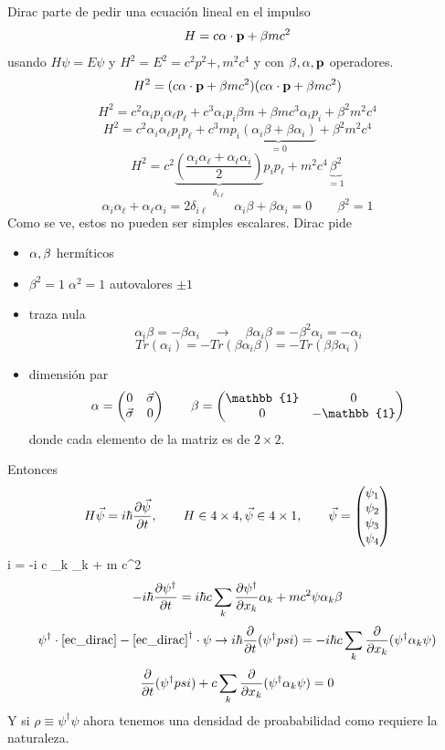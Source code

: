 \documentclass[10pt,oneside]{CBFT_book}
\begin{document}
Dirac parte de pedir una ecuación lineal en el impulso 
\[
	H = c \vb{\alpha} \cdot \vb{p} + \beta m c^2
\]
usando $H\psi = E\psi$ y $H^2 = E^2 = c^2p^2 + ,m^2 c^4$ y con $\beta,\vb{\alpha},\vb{p}$ operadores.
\[
	H^2 = (c \vb{\alpha} \cdot \vb{p} + \beta m c^2)(c \vb{\alpha} \cdot \vb{p} + \beta m c^2)
\]
\[
	H^2 = c^2 \alpha_i p_i \alpha_\ell p_\ell + c^3 \alpha_i p_i \beta m +
	\beta m c^3 \alpha_i p_i + \beta^2 m^2 c^4
\]
\[
	H^2 = c^2 \alpha_i \alpha_\ell p_i  p_\ell + c^3 m p_i \underbrace{( \alpha_i \beta + \beta \alpha_i )}_{=0}
	+ \beta^2 m^2 c^4
\]
\[
	H^2 = 
	c^2 \underbrace{\left( \frac{\alpha_i \alpha_\ell + \alpha_\ell\alpha_i}{2} \right)}_{\delta_{i\ell}}
	p_i p_\ell + m^2 c^4 \underbrace{\beta^2 }_{ = 1 }
\]
\[
	\alpha_i \alpha_\ell + \alpha_\ell\alpha_i = 2 \delta_{i\ell} \qquad 
	\alpha_i \beta + \beta \alpha_i= 0 \qquad
	\beta^2 = 1
\]
Como se ve, estos no pueden ser simples escalares. Dirac pide 
\begin{itemize}
 \item $\vb{\alpha},\beta$ hermíticos
 \item $\beta^2=1 \; \alpha^2=1$ autovalores $\pm 1$
 \item traza nula
 \[
	\alpha_i \beta = -\beta \alpha_i  \quad \rightarrow  \quad 
	\beta \alpha_i \beta = -\beta^2 \alpha_i = -\alpha_i
 \]
 \[
	Tr(\alpha_i) = -Tr(\beta \alpha_i \beta) = -Tr(\beta\beta\alpha_i)
 \]
 \item dimensión par 
 \[
	\vb{\alpha} = \begin{pmatrix} 0 & \vec{\sigma} \\ \vec{\sigma} & 0 \\ \end{pmatrix} \qquad 
	\beta = \begin{pmatrix} \mathbb{1} & 0 \\ 0 & -\mathbb{1} \\ \end{pmatrix}
 \]
 donde cada elemento de la matriz es de $2\times2$.
\end{itemize}

Entonces
\[
	H \vec{\psi} = i \hbar \frac{\partial^{\hspace{-0.05em}} {\vec{\psi}}}{\partial {t}^{\hspace{-0.05em}}}, \qquad H \in 4\times 4, \vec{\psi} \in 4\times 1, \qquad
	\vec{\psi} = \begin{pmatrix} \psi_1 \\ \psi_2 \\ \psi_3 \\ \psi_4 \end{pmatrix}
\]
\be \label{ec_dirac}
	i \hbar {} = -i \hbar c \sum_k \alpha_k  + m c^2 \beta \psi
\ee
\[
	-i \hbar \frac{\partial^{\hspace{-0.05em}} {\psi^\dagger}}{\partial {t}^{\hspace{-0.05em}}} = i \hbar c \sum_k \frac{\partial^{\hspace{-0.05em}} {\psi^\dagger}}{\partial {x_k}^{\hspace{-0.05em}}}\alpha_k + m c^2\psi\alpha_k\beta
\]
\[
	\psi^\dagger\cdot\eqref{ec_dirac} - \eqref{ec_dirac}^\dagger\cdot \psi \rightarrow 
	i\hbar \frac{\partial^{\hspace{-0.05em}} {}}{\partial {t}^{\hspace{-0.05em}}}(\psi^\dagger psi) = -i\hbar c \sum_k \frac{\partial^{\hspace{-0.05em}} {}}{\partial {x_k}^{\hspace{-0.05em}}}(\psi^\dagger \alpha_k \psi)
\]
\[
	\frac{\partial^{\hspace{-0.05em}} {}}{\partial {t}^{\hspace{-0.05em}}}(\psi^\dagger psi) + c \sum_k \frac{\partial^{\hspace{-0.05em}} {}}{\partial {x_k}^{\hspace{-0.05em}}}(\psi^\dagger \alpha_k \psi) = 0
\]
Y si $\rho \equiv \psi^\dagger\psi$ ahora tenemos una densidad de proababilidad como requiere la naturaleza.
\end{document}
